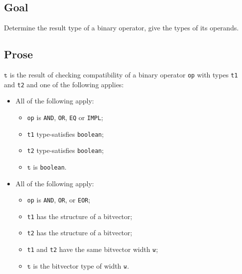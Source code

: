 \documentclass{book}
\newcommand\vt[0]{\texttt{t}}
\newcommand\vw[0]{\texttt{w}}
\begin{document}
\subsection{Goal}
  Determine the result type of a binary operator, give the types of its operands.


\subsection{Prose}
  $\vt$ is the result of checking compatibility of a binary operator \texttt{op} with
  types \texttt{t1} and \texttt{t2} and one of the following applies:
\begin{itemize}
  \item All of the following apply:
    \begin{itemize}
    \item \texttt{op} is \texttt{AND}, \texttt{OR}, \texttt{EQ} or \texttt{IMPL};
    \item \texttt{t1} type-satisfies \texttt{boolean};
    \item \texttt{t2} type-satisfies \texttt{boolean};
    \item $\vt$ is \texttt{boolean}.
    \end{itemize}

  \item All of the following apply:
    \begin{itemize}
    \item \texttt{op} is \texttt{AND}, \texttt{OR}, or \texttt{EOR};
    \item \texttt{t1} has the structure of a bitvector;
    \item \texttt{t2} has the structure of a bitvector;
    \item \texttt{t1} and \texttt{t2} have the same bitvector width $\vw$;
    \item $\vt$ is the bitvector type of width $\vw$.
    \end{itemize}


\end{itemize}
\end{document}
